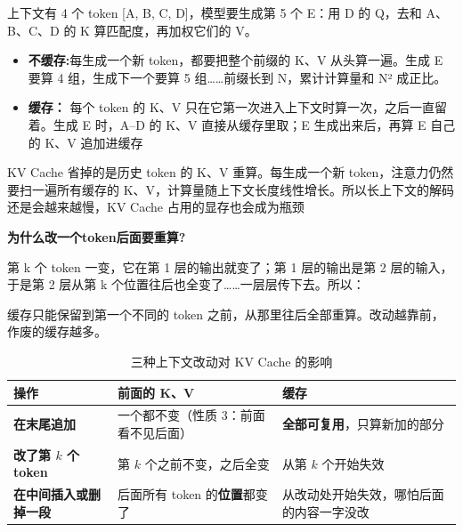 上下文有 4 个 token [A, B, C, D]，模型要生成第 5 个 E：用 D 的 Q，去和 A、B、C、D 的 K 算匹配度，再加权它们的 V。
\begin{itemize}
  \item \textbf{不缓存:}每生成一个新 token，都要把整个前缀的 K、V 从头算一遍。生成 E 要算 4 组，生成下一个要算 5 组……前缀长到 N，累计计算量和 N² 成正比。
  \item \textbf{缓存：} 每个 token 的 K、V 只在它第一次进入上下文时算一次，之后一直留着。生成 E 时，A–D 的 K、V 直接从缓存里取；E 生成出来后，再算 E 自己的 K、V 追加进缓存
\end{itemize}
KV Cache 省掉的是历史 token 的 K、V 重算。每生成一个新 token，注意力仍然要扫一遍所有缓存的 K、V，计算量随上下文长度线性增长。所以长上下文的解码还是会越来越慢，KV Cache 占用的显存也会成为瓶颈

\textbf{为什么改一个token后面要重算?}

第 k 个 token 一变，它在第 1 层的输出就变了；第 1 层的输出是第 2 层的输入，于是第 2 层从第 k 个位置往后也全变了……一层层传下去。所以：
\begin{tcolorbox}[enhanced, sharp corners, boxrule=0pt, frame hidden,
                  borderline west={3pt}{0pt}{structurecolor},
                  colback=structurecolor!5]
  缓存只能保留到第一个不同的 token 之前，从那里往后全部重算。改动越靠前，作废的缓存越多。
\end{tcolorbox}
\begin{table}[H]
\centering
\caption{三种上下文改动对 KV Cache 的影响}
\label{tab:kv-cache-ops}
\begin{tabular}{p{3.6cm} p{5.4cm} p{5.6cm}}
  \toprule
  操作 & 前面的 K、V & 缓存 \\
  \midrule
  \textbf{在末尾追加} &
    一个都不变（性质 3：前面看不见后面） &
    \textbf{全部可复用}，只算新加的部分 \\
  \addlinespace
  \textbf{改了第 $k$ 个 token} &
    第 $k$ 个之前不变，之后全变 &
    从第 $k$ 个开始失效 \\
  \addlinespace
  \textbf{在中间插入或删掉一段} &
    后面所有 token 的\textbf{位置}都变了 &
    从改动处开始失效，哪怕后面的内容一字没改 \\
  \bottomrule
\end{tabular}
\end{table}
